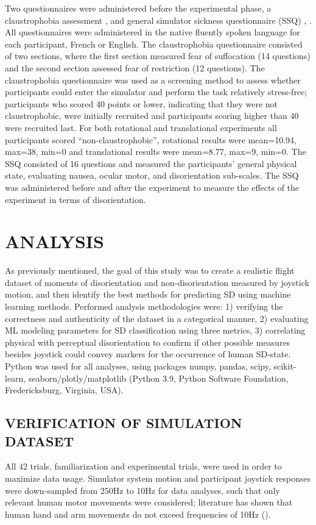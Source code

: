 \documentclass[11pt, onecolumn]{article}
\begin{document}
Two questionnaires were administered before the experimental phase, a claustrophobia assessment \cite{Radomsky_2001_Claustrophobia}, \cite{Radomsky_2006_Claustrophobia_CLQ} and general simulator sickness questionnaire (SSQ) \cite{Kennedy_1993_Simulator}, \cite{Bouchard_2007_SimulatorSickness}.  All questionnaires were administered in the native fluently spoken language for each participant, French or English.  The claustrophobia questionnaire consisted of two sections, where the first section measured fear of suffocation (14 questions) and the second section assessed fear of restriction (12 questions).  The claustrophobia questionnaire was used as a screening method to assess whether participants could enter the simulator and perform the task relatively stress-free; participants who scored 40 points or lower, indicating that they were not claustrophobic, were initially recruited and participants scoring higher than 40 were recruited last. For both rotational and translational experiments all participants scored “non-claustrophobic”, rotational results were mean=10.94, max=38, min=0 and translational results were mean=8.77, max=9, min=0.  The SSQ consisted of 16 questions and measured the participants’ general physical state, evaluating nausea, ocular motor, and disorientation sub-scales. The SSQ was administered before and after the experiment to measure the effects of the experiment in terms of disorientation.  

\section{ANALYSIS}
As previously mentioned, the goal of this study was to create a realistic flight dataset of moments of disorientation and non-disorientation measured by joystick motion, and then identify the best methods for predicting SD using machine learning methods.  Performed analysis methodologies were: 1) verifying the correctness and authenticity of the dataset in a categorical manner, 2) evaluating ML modeling parameters for SD classification using three metrics, 3) correlating physical with perceptual disorientation to confirm if other possible measures besides joystick could convey markers for the occurrence of human SD-state.  Python was used for all analyses, using packages numpy, pandas, scipy, scikit-learn, seaborn/plotly/matplotlib  (Python 3.9, Python Software Foundation, Fredericksburg, Virginia, USA).

\subsection{VERIFICATION OF SIMULATION DATASET}
All 42 trials, familiarization and experimental trials, were used in order to maximize data usage.  Simulator system motion and participant joystick responses were down-sampled from 250Hz to 10Hz for data analyses, such that only relevant human motor movements were considered; literature has shown that human hand and arm movements do not exceed frequencies of 10Hz (\cite{Shadmehr_2004_Computational}).
\end{document}
